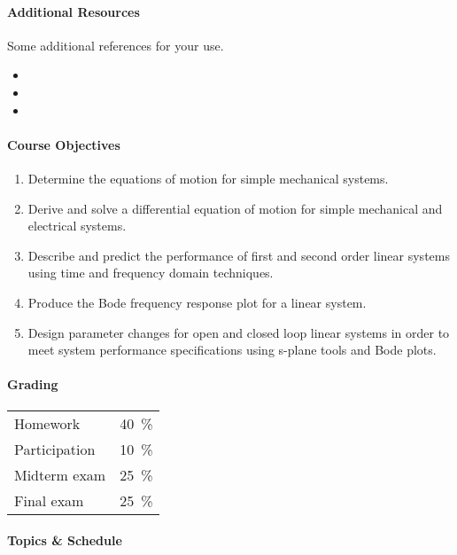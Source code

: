 \documentclass[11pt, reqno]{article}   	%
\begin{document}
\paragraph{Additional Resources} 
Some additional references for your use.
\begin{itemize}
    \item {}
    \item {}
    \item {}
\end{itemize}

\paragraph{Course Objectives}
\begin{enumerate}
    \item Determine the equations of motion for simple mechanical systems.
    \item Derive and solve a differential equation of motion for simple mechanical and electrical systems.
    \item Describe and predict the performance of first and second order linear systems using time and frequency domain techniques.
    \item Produce the Bode frequency response plot for a linear system.
    \item Design parameter changes for open and closed loop linear systems in order to meet system performance specifications using s-plane tools and Bode plots.
\end{enumerate}

\paragraph{Grading}
\begin{tabular}[t]{lr}
    Homework & \SI{40}{\percent} \\
    Participation & \SI{10}{\percent}\\
    Midterm exam & \SI{25}{\percent}\\
    Final exam & \SI{25}{\percent}
\end{tabular}

\paragraph{Topics \& Schedule}
\end{document}
